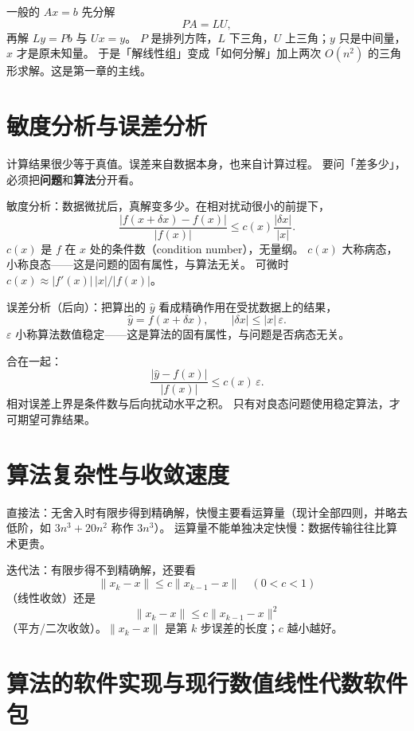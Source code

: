 一般的 $Ax=b$ 先分解
\[
PA=LU,
\]
再解 $Ly=Pb$ 与 $Ux=y$。
$P$ 是排列方阵，$L$ 下三角，$U$ 上三角；$y$ 只是中间量，$x$ 才是原未知量。
于是「解线性组」变成「如何分解」加上两次 $O(n^2)$ 的三角形求解。这是第一章的主线。

\section{敏度分析与误差分析}

计算结果很少等于真值。误差来自数据本身，也来自计算过程。
要问「差多少」，必须把\textbf{问题}和\textbf{算法}分开看。

敏度分析：数据微扰后，真解变多少。在相对扰动很小的前提下，
\begin{equation}
\frac{\lvert f(x+\delta x)-f(x)\rvert}{\lvert f(x)\rvert}
\le c(x)\frac{\lvert\delta x\rvert}{\lvert x\rvert}.
\end{equation}
$c(x)$ 是 $f$ 在 $x$ 处的条件数（condition number），无量纲。
$c(x)$ 大称病态，小称良态——这是问题的固有属性，与算法无关。
可微时 $c(x)\approx\lvert f'(x)\rvert\,\lvert x\rvert/\lvert f(x)\rvert$。

误差分析（后向）：把算出的 $\hat y$ 看成精确作用在受扰数据上的结果，
\[
\hat y=f(x+\delta x),\qquad \lvert\delta x\rvert\le\lvert x\rvert\,\varepsilon.
\]
$\varepsilon$ 小称算法数值稳定——这是算法的固有属性，与问题是否病态无关。

合在一起：
\begin{equation}
\frac{\lvert\hat y-f(x)\rvert}{\lvert f(x)\rvert}\le c(x)\,\varepsilon.
\end{equation}
相对误差上界是条件数与后向扰动水平之积。
只有对良态问题使用稳定算法，才可期望可靠结果。

\section{算法复杂性与收敛速度}

直接法：无舍入时有限步得到精确解，快慢主要看运算量（现计全部四则，并略去低阶，如 $3n^3+20n^2$ 称作 $3n^3$）。
运算量不能单独决定快慢：数据传输往往比算术更贵。

迭代法：有限步得不到精确解，还要看
\[
\lVert x_k-x\rVert\le c\lVert x_{k-1}-x\rVert
\quad(0<c<1)
\]
（线性收敛）还是
\[
\lVert x_k-x\rVert\le c\lVert x_{k-1}-x\rVert^2
\]
（平方/二次收敛）。$\lVert x_k-x\rVert$ 是第 $k$ 步误差的长度；$c$ 越小越好。

\section{算法的软件实现与现行数值线性代数软件包}

